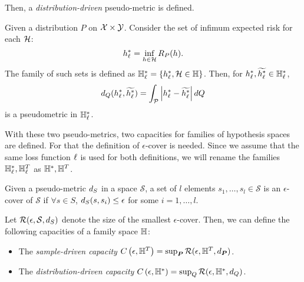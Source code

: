 Then, a \emph{distribution-driven} pseudo-metric is defined. 
\begin{definition}
    \label{def:dist_pseudometric}
    Given a distribution $P$ on $\mathcal{X} \times \mathcal{Y}$. Consider the set of infimum expected risk for each $\mathcal{H}$:
\begin{equation}
    \nonumber
    h_\ell^* = \inf_{h \in \mathcal{H}} R_P(h).
\end{equation}
The family of such sets is defined as 
$\mathbb{H}^{*}_\ell = \left\{h_\ell^*, \mathcal{H} \in \mathbb{H}\right\}$.
Then, for $h_\ell^*, \widetilde{h_\ell^*} \in \mathbb{H}_\ell^*$,
\begin{equation}
    \nonumber
    d_{Q}(h_\ell^*, \widetilde{h_\ell^*}) = \int_{\mathcal{P}} \left|h_\ell^* - \widetilde{h_\ell^*}\right| dQ
\end{equation}
is a pseudometric in $\mathbb{H}_\ell^*$.
\end{definition}
With these two pseudo-metrics, two capacities for families of hypothesis spaces are defined. For that the definition of $\epsilon$-cover is needed. 
Since we assume that the same loss function $\ell$ is used for both definitions, we will rename the families $\mathbb{H}^*_\ell, \mathbb{H}^T_\ell$ as $\mathbb{H}^*, \mathbb{H}^T$.
\begin{definition}
    \label{def:epsilon_cover}
    Given a pseudo-metric $d_{S}$ in a space $\mathcal{S}$, 
a set of $l$ elements $s_1, \ldots, s_l \in \mathcal{S}$ is an $\epsilon$-cover of $\mathcal{S}$ if 
$ \forall s \in S$, $d_{S}(s, s_i) \leq \epsilon $
for some $i=1, \ldots, l$.
\end{definition}
%
Let $\mathcal{R}(\epsilon, \mathcal{S}, d_{S})$ denote the size of the smallest $\epsilon$-cover.
Then, we can define the following capacities of a family space $\mathbb{H}$:
\begin{itemize}
    \item The \emph{sample-driven capacity} $C\left(\epsilon, \mathbb{H}^{T}\right) = \sup_{\bm{P}} \mathcal{R}(\epsilon, \mathbb{H}^T, d_{\bm{P}})$.
    \item The \emph{distribution-driven capacity} $C\left(\epsilon, \mathbb{H}^{*}\right) = \sup_Q \mathcal{R}(\epsilon, \mathbb{H}^{*}, d_{Q})$.
\end{itemize}

